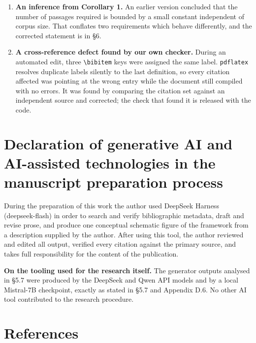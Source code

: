 \documentclass[authoryear,review,3p,times]{elsarticle}
\begin{document}
\begin{enumerate}
\item
  \textbf{An inference from Corollary 1.} An earlier version concluded that the number of passages required is bounded by a small constant independent of corpus size. That conflates two requirements which behave differently, and the corrected statement is in §6.
\item
  \textbf{A cross-reference defect found by our own checker.} During an automated edit, three \texttt{\textbackslash bibitem} keys were assigned the same label. \texttt{pdflatex} resolves duplicate labels silently to the last definition, so every citation affected was pointing at the wrong entry while the document still compiled with no errors. It was found by comparing the citation set against an independent source and corrected; the check that found it is released with the code.
\end{enumerate}

\section{Declaration of generative AI and AI-assisted technologies in the manuscript preparation process}\label{ai-declaration}

During the preparation of this work the author used DeepSeek Harness (deepseek-flash) in order to search and verify bibliographic metadata, draft and revise prose, and produce one conceptual schematic figure of the framework from a description supplied by the author. After using this tool, the author reviewed and edited all output, verified every citation against the primary source, and takes full responsibility for the content of the publication.

\textbf{On the tooling used for the research itself.} The generator outputs analysed in §5.7 were produced by the DeepSeek and Qwen API models and by a local Mistral-7B checkpoint, exactly as stated in §5.7 and Appendix D.6. No other AI tool contributed to the research procedure.

\section{References}\label{references}
\end{document}
